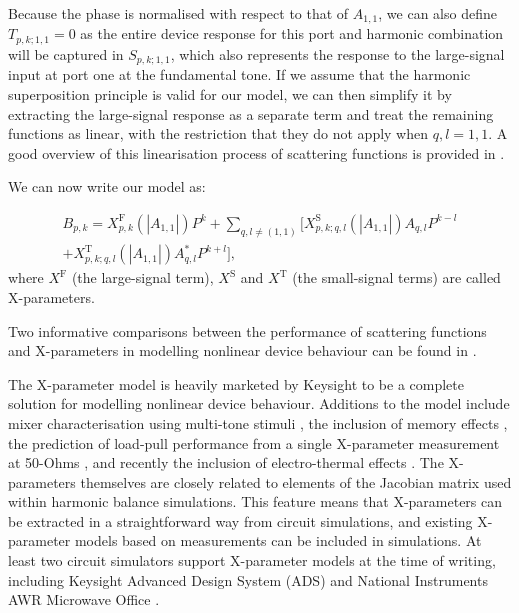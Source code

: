 \documentclass[../thesis/thesis.tex]{subfiles}
\begin{document}
Because the phase is normalised with respect to that of $A_{1, 1}$, we can also define $T_{p,k;1,1}=0$ as the entire device response for this port and harmonic combination will be captured in $S_{p,k;1,1}$, which also represents the response to the large-signal input at port one at the fundamental tone. If we assume that the harmonic superposition principle is valid for our model, we can then simplify it by extracting the large-signal response as a separate term and treat the remaining functions as linear, with the restriction that they do not apply when $q, l = 1, 1$. A good overview of this linearisation process of scattering functions is provided in \cite{Verspecht_2005b}.

We can now write our model as:

\begin{equation}
\begin{split}
B_{p, k}=X^\textrm{F}_{p, k}(|A_{1, 1}|)P^k+\sum_{q, l\ne(1,1)}[X^\textrm{S}_{p, k;q, l}(|A_{1, 1}|)A_{q, l}P^{k-l}\\+X^\textrm{T}_{p, k;q, l}(|A_{1, 1}|)A^*_{q, l}P^{k+l}],
\end{split}
\label{ch5_eqn_xps}
\end{equation}
where $X^\textrm{F}$ (the large-signal term), $X^\textrm{S}$ and $X^\textrm{T}$ (the small-signal terms) are called X-parameters.

Two informative comparisons between the performance of scattering functions and X-parameters in modelling nonlinear device behaviour can be found in \cite{Sun_2010,Widemann_2015}.

The X-parameter model is heavily marketed by Keysight to be a complete solution for modelling nonlinear device behaviour. Additions to the model include mixer characterisation using multi-tone stimuli \cite{Xie_2012}, the inclusion of memory effects \cite{Verspecht_2009}, the prediction of load-pull performance from a single X-parameter measurement at 50-Ohms \cite{Root_2017}, and recently the inclusion of electro-thermal effects \cite{Gillespie_2018}. The X-parameters themselves are closely related to elements of the Jacobian matrix used within harmonic balance simulations. This feature means that X-parameters can be extracted in a straightforward way from circuit simulations, and existing X-parameter models based on measurements can be included in simulations. At least two circuit simulators support X-parameter models at the time of writing, including Keysight Advanced Design System (ADS) \cite{ADS} and National Instruments AWR Microwave Office \cite{AWR}.
\end{document}
